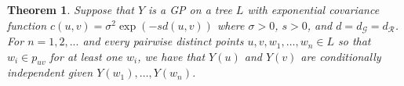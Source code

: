 \documentclass[alpha-refs]{wiley-article}
\newtheorem{thm}{Theorem}
\begin{document}




\begin{thm}\label{t:markov}
	Suppose that $Y$ is a GP on a tree $L$ with exponential covariance function $c(u,v) = \sigma^2\exp(-s d(u, v))$ where $\sigma>0$, $s>0$, and $d=d_{\mathcal G}=d_{\mathcal R}$. 
	For $n=1,2,...$ and every pairwise distinct points $u,v,w_1,\ldots,w_n\in L$ so that $w_i\in p_{uv}$ for at least one $w_i$, we have that $Y(u)$ and $Y(v)$ are conditionally independent given $Y(w_1),\ldots,Y(w_n)$.
\end{thm}
\end{document}
